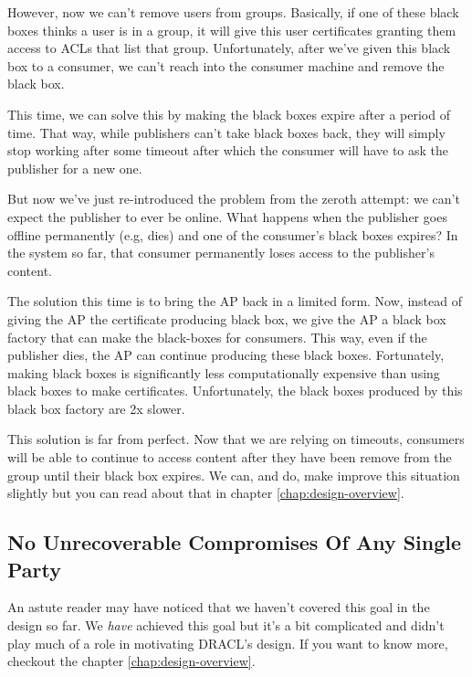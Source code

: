 \documentclass[pdftex,12pt,a4papaer]{report}
\begin{document}
However, now we can't remove users from groups. Basically, if one of these black
boxes thinks a user is in a group, it will give this user certificates granting
them access to ACLs that list that group. Unfortunately, after we've given this
black box to a consumer, we can't reach into the consumer machine and remove the
black box.

This time, we can solve this by making the black boxes expire after a period of
time. That way, while publishers can't take black boxes back, they will simply
stop working after some timeout after which the consumer will have to ask the
publisher for a new one.

But now we've just re-introduced the problem from the zeroth attempt: we can't
expect the publisher to ever be online. What happens when the publisher goes
offline permanently (e.g, dies) and one of the consumer's black boxes expires?
In the system so far, that consumer permanently loses access to the publisher's
content.

The solution this time is to bring the AP back in a limited form. Now, instead
of giving the AP the certificate producing black box, we give the AP a black box
factory that can make the black-boxes for consumers. This way, even if the
publisher dies, the AP can continue producing these black boxes. Fortunately,
making black boxes is significantly less computationally expensive than using
black boxes to make certificates. Unfortunately, the black boxes produced by
this black box factory are 2x slower.

This solution is far from perfect. Now that we are relying on timeouts,
consumers will be able to continue to access content after they have been remove
from the group until their black box expires. We can, and do, make improve this
situation slightly but you can read about that in chapter
\ref{chap:design-overview}.

\subsection{No Unrecoverable Compromises Of Any Single Party}

An astute reader may have noticed that we haven't covered this goal in the
design so far. We \emph{have} achieved this goal but it's a bit complicated and
didn't play much of a role in motivating DRACL's design. If you want to know
more, checkout the chapter \ref{chap:design-overview}.
\end{document}
